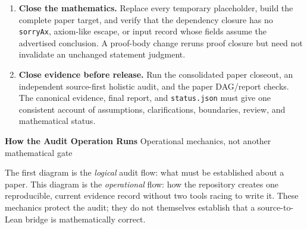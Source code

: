 \documentclass[10pt]{article}
\newcommand{\Lean}{Lean}
\newcommand{\file}[1]{\texttt{#1}}
\begin{document}
\begin{enumerate}
  \item \textbf{Close the mathematics.} Replace every temporary placeholder,
  build the complete paper target, and verify that the dependency closure has
  no \file{sorryAx}, axiom-like escape, or input record whose fields assume the
  advertised conclusion. A proof-body change reruns proof closure but need not
  invalidate an unchanged statement judgment.

\item \textbf{Close evidence before release.} Run the consolidated paper
  closeout, an independent source-first holistic audit, and the paper DAG/report
  checks. The canonical evidence, final report, and \file{status.json} must give
  one consistent account of assumptions, clarifications, boundaries, review, and
  mathematical status.
\end{enumerate}

\newpage

{\sffamily\bfseries\Large How the Audit Operation Runs}\hfill
{\sffamily\small Operational mechanics, not another mathematical gate}

\vspace{3pt}
The first diagram is the \emph{logical} audit flow: what must be established
about a paper. This diagram is the \emph{operational} flow: how the repository
creates one reproducible, current evidence record without two tools racing to
write it. These mechanics protect the audit; they do not themselves establish
that a source-to-\Lean{} bridge is mathematically correct.
\end{document}
